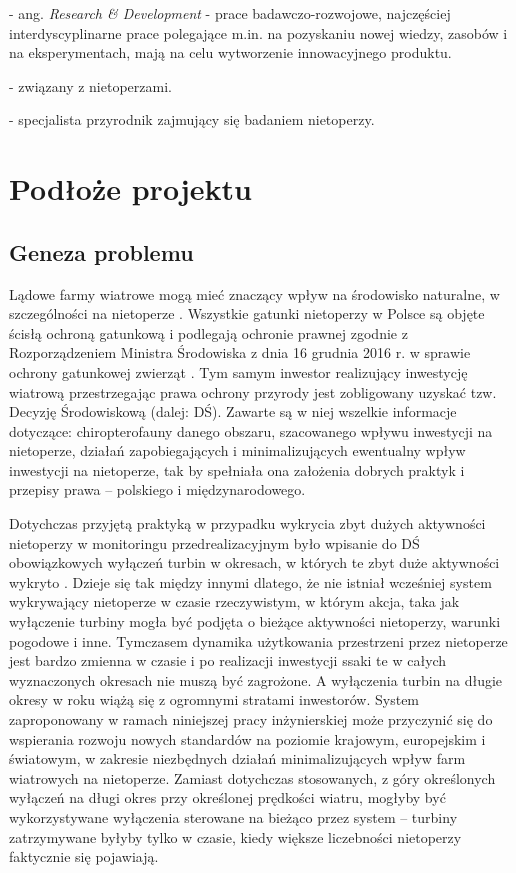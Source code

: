 \documentclass{sprz}
\begin{document}
\begin{description}[align=left]
  \item [R\&D] - ang. \textit{Research \& Development} - prace badawczo-rozwojowe, najczęściej interdyscyplinarne prace polegające m.in. na pozyskaniu nowej wiedzy, zasobów i na eksperymentach, mają na celu wytworzenie innowacyjnego produktu. 
  \item [Chiropterologiczny] - związany z nietoperzami.
  \item [Chiropterolog] - specjalista przyrodnik zajmujący się badaniem nietoperzy.
\end{description}

\chapter{Podłoże projektu}

\section{Geneza problemu}

Lądowe farmy wiatrowe mogą mieć znaczący wpływ na środowisko naturalne, w szczególności na nietoperze \cite{Wytyczne}. Wszystkie gatunki nietoperzy w Polsce są objęte ścisłą ochroną gatunkową i podlegają ochronie prawnej zgodnie z Rozporządzeniem Ministra Środowiska z dnia 16 grudnia 2016 r. w sprawie ochrony gatunkowej zwierząt \cite{Rozporządzenie}. Tym samym inwestor realizujący inwestycję wiatrową przestrzegając prawa ochrony przyrody jest zobligowany uzyskać tzw. Decyzję Środowiskową (dalej: DŚ). Zawarte są w niej wszelkie informacje dotyczące: chiropterofauny danego obszaru, szacowanego wpływu inwestycji na nietoperze, działań zapobiegających i minimalizujących ewentualny wpływ inwestycji na nietoperze, tak by spełniała ona założenia dobrych praktyk i przepisy prawa – polskiego i międzynarodowego. 

Dotychczas przyjętą praktyką w przypadku wykrycia zbyt dużych aktywności nietoperzy w monitoringu przedrealizacyjnym było wpisanie do DŚ obowiązkowych wyłączeń turbin w okresach, w których te zbyt duże aktywności wykryto \cite{Wytyczne}. Dzieje się tak między innymi dlatego, że nie istniał wcześniej system wykrywający nietoperze w czasie rzeczywistym, w którym akcja, taka jak wyłączenie turbiny mogła być podjęta o bieżące aktywności nietoperzy, warunki pogodowe i inne. Tymczasem dynamika użytkowania przestrzeni przez nietoperze jest bardzo zmienna w czasie i po realizacji inwestycji ssaki te w całych wyznaczonych okresach nie muszą być zagrożone. A wyłączenia turbin na długie okresy w roku wiążą się z ogromnymi stratami inwestorów. System zaproponowany w ramach niniejszej pracy inżynierskiej może przyczynić się do wspierania rozwoju nowych standardów na poziomie krajowym, europejskim i światowym, w zakresie niezbędnych działań minimalizujących wpływ farm wiatrowych na nietoperze. Zamiast dotychczas stosowanych, z góry określonych wyłączeń na długi okres przy określonej prędkości wiatru, mogłyby być wykorzystywane wyłączenia sterowane na bieżąco przez system – turbiny zatrzymywane byłyby tylko w czasie, kiedy większe liczebności nietoperzy faktycznie się pojawiają.
\end{document}
